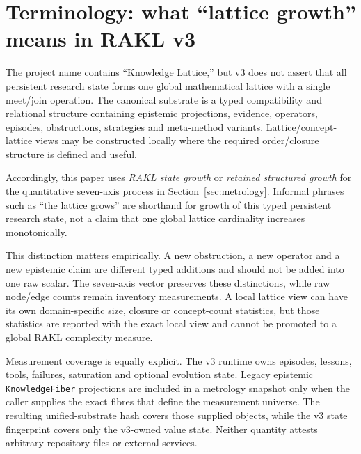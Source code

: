 \section{Terminology: what ``lattice growth'' means in RAKL v3}
\label{sec:terminology}

The project name \RAKL{} contains ``Knowledge Lattice,'' but v3 does not assert that all persistent research state forms one global mathematical lattice with a single meet/join operation. The canonical substrate is a typed compatibility and relational structure containing epistemic projections, evidence, operators, episodes, obstructions, strategies and meta-method variants. Lattice/concept-lattice views may be constructed locally where the required order/closure structure is defined and useful.

Accordingly, this paper uses \emph{RAKL state growth} or \emph{retained structured growth} for the quantitative seven-axis process in Section~\ref{sec:metrology}. Informal phrases such as ``the lattice grows'' are shorthand for growth of this typed persistent research state, not a claim that one global lattice cardinality increases monotonically.

This distinction matters empirically. A new obstruction, a new operator and a new epistemic claim are different typed additions and should not be added into one raw scalar. The seven-axis vector preserves these distinctions, while raw node/edge counts remain inventory measurements. A local lattice view can have its own domain-specific size, closure or concept-count statistics, but those statistics are reported with the exact local view and cannot be promoted to a global RAKL complexity measure.

Measurement coverage is equally explicit. The v3 runtime owns episodes, lessons, tools, failures, saturation and optional evolution state. Legacy epistemic \texttt{KnowledgeFiber} projections are included in a metrology snapshot only when the caller supplies the exact fibres that define the measurement universe. The resulting unified-substrate hash covers those supplied objects, while the v3 state fingerprint covers only the v3-owned value state. Neither quantity attests arbitrary repository files or external services.
